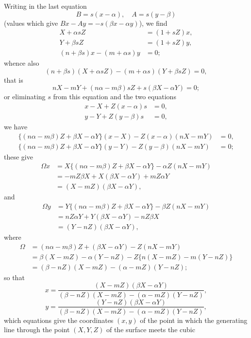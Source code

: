 \documentclass[11pt,a4paper]{article}
\theoremstyle{plain}
\begin{document}
Writing in the last equation
\[
B = s(x - \alpha), \quad A = s(y - \beta)
\]
(values which give $Bx - Ay = -s(\beta x - \alpha y)$), we find
\begin{align*}
X + \alpha s Z &= (1 + sZ)x, \\
Y + \beta s Z &= (1 + sZ)y, \\
(n + \beta s)x - (m + \alpha s)y &= 0;
\end{align*}
whence also
\[
(n + \beta s)(X + \alpha s Z) - (m + \alpha s)(Y + \beta s Z) = 0,
\]
that is
\[
nX - mY + (n\alpha - m\beta)sZ + s(\beta X - \alpha Y) = 0;
\]
or eliminating $s$ from this equation and the two equations
\begin{align*}
x - X + Z(x - \alpha)s &= 0, \\
y - Y + Z(y - \beta)s &= 0,
\end{align*}
we have
\begin{align*}
\{(n\alpha - m\beta)Z + \beta X - \alpha Y\}(x - X) - Z(x - \alpha)(nX - mY) &= 0, \\
\{(n\alpha - m\beta)Z + \beta X - \alpha Y\}(y - Y) - Z(y - \beta)(nX - mY) &= 0;
\end{align*}
these give
\begin{align*}
\Omega x &= X\{(n\alpha - m\beta)Z + \beta X - \alpha Y\} - \alpha Z(nX - mY) \\
&= -mZ\beta X + X(\beta X - \alpha Y) + mZ\alpha Y \\
&= (X - mZ)(\beta X - \alpha Y),
\end{align*}
and
\begin{align*}
\Omega y &= Y\{(n\alpha - m\beta)Z + \beta X - \alpha Y\} - \beta Z(nX - mY) \\
&= nZ\alpha Y + Y(\beta X - \alpha Y) - nZ\beta X \\
&= (Y - nZ)(\beta X - \alpha Y),
\end{align*}
where
\begin{align*}
\Omega &= (n\alpha - m\beta)Z + (\beta X - \alpha Y) - Z(nX - mY) \\
&= \beta(X - mZ) - \alpha(Y - nZ) - Z\{n(X - mZ) - m(Y - nZ)\} \\
&= (\beta - nZ)(X - mZ) - (\alpha - mZ)(Y - nZ);
\end{align*}
so that
\[
x = \frac{(X - mZ)(\beta X - \alpha Y)}{(\beta - nZ)(X - mZ) - (\alpha - mZ)(Y - nZ)},
\]
\[
y = \frac{(Y - nZ)(\beta X - \alpha Y)}{(\beta - nZ)(X - mZ) - (\alpha - mZ)(Y - nZ)},
\]
which equations give the coordinates $(x, y)$ of the point in which the generating line through the point $(X, Y, Z)$ of the surface meets the cubic
\end{document}
